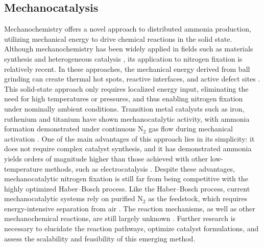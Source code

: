 \subsection{Mechanocatalysis}
Mechanochemistry offers a novel approach to distributed ammonia production, utilizing mechanical energy to drive chemical reactions in the solid state. Although mechanochemistry has been widely applied in fields such as materials synthesis \cite{Uzarevic2015Real-TimeChemists, Weidenthaler2009ComplexStorage} and heterogeneous catalysis \cite{Bilke2019MethanePathway, Bolm2019MechanochemistryReactants}, its application to nitrogen fixation is relatively recent. In these approaches, the mechanical energy derived from ball grinding can create thermal hot spots, reactive interfaces, and active defect sites \cite{Tricker2020MechanocatalyticMicroenvironments, Suryanarayana2001MechanicalMilling,Immohr2013AnMilling,Schreyer2017OscillatoryCatalysts,Takacs2013TheMechanochemistry, Yu2025EvaluatingOxide}. This solid-state approach only requires localized energy input, eliminating the need for high temperatures or pressures, and thus enabling nitrogen fixation under nominally ambient conditions. Transition metal catalysts such as iron, ruthenium and titanium have shown mechanocatalytic activity, with ammonia formation demonstrated under continuous N$_2$ gas flow during mechanical activation \cite{Heinicke1961DieKatalysators, Peter1974ZurWasser, Reichle2024MechanocatalyticPathway, Reichle2021MechanocatalyticPressure, Tricker2020MechanocatalyticMicroenvironments}. One of the main advantages of this approach lies in its simplicity: it does not require complex catalyst synthesis, and it has demonstrated ammonia yields orders of magnitude higher than those achieved with other low-temperature methods, such as electrocatalysis \cite{Han2021MechanochemistryConditions, Kim2023AchievingMechanochemistry}. Despite these advantages, mechanocatalytic nitrogen fixation is still far from being competitive with the highly optimized Haber–Bosch process. Like the Haber–Bosch process, current mechanocatalytic systems rely on purified N$_2$ as the feedstock, which requires energy-intensive separation from air \cite{Tricker2020MechanocatalyticMicroenvironments}. The reaction mechanisms, as well as other mechanochemical reactions, are still largely unknown \cite{Immohr2013AnMilling, Boldyrev1990MechanochemistrySolids, Schiffmann2020In-situNMR}. Further research is necessary to elucidate the reaction pathways, optimize catalyst formulations, and assess the scalability and feasibility of this emerging method. 

